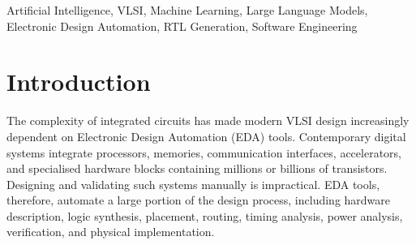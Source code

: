 \documentclass[conference]{IEEEtran}
\begin{document}
\begin{abstract}
The growing complexity of modern VLSI systems has made Electronic Design Automation (EDA) tools essential for hardware development. However, existing workflows still require multiple tools, repetitive scripting, and extensive design-space exploration. Recent advances in artificial intelligence (AI), machine learning (ML), and large language models (LLMs) offer ways to automate these tasks. This paper reviews and compares fourteen studies on AI-driven EDA, covering ML-based prediction and optimisation, graph neural networks (GNNs), RTL generation, domain-adapted LLMs, and autonomous EDA agents. The studies are classified by AI technique, design stage, and a five-level automation scale introduced in this paper. Software engineering principles, including modularity, interoperability, testing, and reproducibility, guide the analysis of research gaps and the identification of future directions. The paper also presents a methodology for measuring how evaluation choices affect RTL generation pass@1, validated first on synthetic models with known behaviour and then applied to a small open model on a 30-problem subset of VerilogEval, where the sampling seed is found to move the reported pass@1 more than the prompt wording, code-extraction rule, or module-naming convention combined. The review highlights fragmented research, inconsistent evaluation practices, and the continued need for reliable verification of AI-generated designs.
\end{abstract}
\vspace{0.5cm}
\begin{IEEEkeywords}
Artificial Intelligence, VLSI, Machine Learning, Large Language Models, Electronic Design Automation, RTL Generation, Software Engineering
\end{IEEEkeywords}


\section{Introduction}
The complexity of integrated circuits has made modern VLSI design increasingly dependent on Electronic Design Automation (EDA) tools. Contemporary digital systems integrate processors, memories, communication interfaces, accelerators, and specialised hardware blocks containing millions or billions of transistors. Designing and validating such systems manually is impractical. EDA tools, therefore, automate a large portion of the design process, including hardware description, logic synthesis, placement, routing, timing analysis, power analysis, verification, and physical implementation.\\
\end{document}
